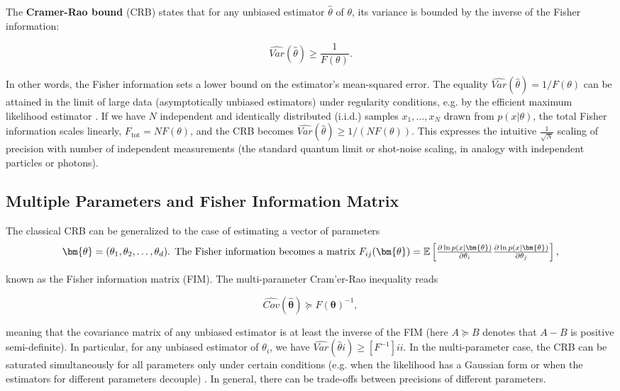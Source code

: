 The \textbf{Cramer-Rao bound} (CRB) states that for any unbiased
estimator $\hat{\theta}$ of $\theta$, its variance is bounded by the
inverse of the Fisher information:

\begin{equation}
\widehat{Var}(\hat{\theta})\ge\frac{1}{F(\theta)}.
\label{eq:CRB-classical}
\end{equation}

In other words, the Fisher information sets a lower bound on the
estimator’s mean-squared error. The equality $\widehat{Var}(\hat{\theta}) =
1/F(\theta)$ can be attained in the limit of large data
(asymptotically unbiased estimators) under regularity conditions,
e.g. by the efficient maximum likelihood estimator \cite{Kay1993}. If
we have $N$ independent and identically distributed (i.i.d.) samples
$x_1,\dots,x_N$ drawn from $p(x|\theta)$, the total Fisher information
scales linearly, $F_{\text{tot}} = N F(\theta)$, and the CRB becomes
$\widehat{Var}(\hat{\theta}) \ge 1/(N F(\theta))$. This expresses the intuitive
$\frac{1}{\sqrt{N}}$ scaling of precision with number of independent
measurements (the standard quantum limit or shot-noise scaling, in
analogy with independent particles or photons).



\subsection{Multiple Parameters and Fisher Information Matrix}



The classical CRB can be generalized to the case of estimating a
vector of parameters
\[
\bm{\theta} =
(\theta_1,\theta_2,\dots,\theta_d)$. The Fisher information becomes a
matrix $F_{ij}(\bm{\theta}) = \mathbb{E}\left[ \frac{\partial \ln
    p(x|\bm{\theta})}{\partial \theta_i}\frac{\partial \ln
    p(x|\bm{\theta})}{\partial \theta_j} \right],
\]

known as the Fisher information matrix (FIM). The multi-parameter
Cram'er-Rao inequality reads

\begin{equation}
\widehat{Cov}(\hat{\bm{\theta}}) \succeq F(\bm{\theta})^{-1},
\end{equation}

meaning that the covariance matrix of any unbiased estimator is at
least the inverse of the FIM (here $A \succeq B$ denotes that $A - B$
is positive semi-definite). In particular, for any unbiased estimator
of $\theta_i$, we have $\widehat{Var}(\hat{\theta}i) \ge [F^{-1}]{ii}$. In the
multi-parameter case, the CRB can be saturated simultaneously for all
parameters only under certain conditions (e.g. when the likelihood has
a Gaussian form or when the estimators for different parameters
decouple) \cite{Kay1993}. In general, there can be trade-offs between
precisions of different parameters.



